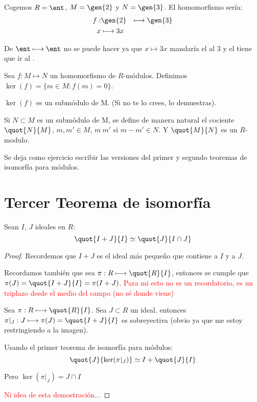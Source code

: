 \begin{example}
	Cogemos $R= \ent$, $M=\gen{2}$ y $N=\gen{3}$. El homomorfismo sería:
	\begin{align*}
		f:& \gen{2} & \longmapsto  \gen{3}\\
		x & \longmapsto 3x \\
	\end{align*}
	
	\obs De $\ent \longmapsto \ent$ no se puede hacer ya que $x \longmapsto 3x$ mandaría el \one al 3 y el \one tiene que ir al \one.
\end{example}

\begin{defn}
	Sea $f:M \longmapsto N$ un homomorfismo de $R$-módulos. Definimos $\ker(f)=\{ m\in M:f(m)=0 \}$.
\end{defn}

\obs $\ker(f)$ es un submódulo de M. (Si no te lo crees, lo demuestras).

\begin{defn}
Si $N \subset M$ es un submódulo de M, se define de manera natural el cociente $\quot{N}{M}$, $m,m' \in M$, $m~m'$ si $m-m' \in N$. Y $\quot{M}{N}$ es un $R$-modulo.
\end{defn}

Se deja como ejercicio escribir las versiones del primer y segundo teoremas de isomorfía para módulos.

\section{Tercer Teorema de isomorfía}
\begin{theorem}
	Sean $I$, $J$ ideales en $R$:
	$$ \quot{I+J}{I} \simeq \quot{J}{I \cap J} $$
\end{theorem}
\begin{proof}
	Recordemos que $I+J$ es el ideal más pequeño que contiene a $I$ y a $J$.
	
	Recordamos también que sea $\pi: R \longmapsto \quot{R}{I}$, entonces se cumple que $\pi(J)=\quot{I+J}{I}=\pi(I+J)$. \textcolor{red}{Para mi esto no es un recordatorio, es un triplazo desde el medio del campo (no sé donde viene)}
	
	Sea $\pi: R \longmapsto \quot{R}{I}$. Sea $J \subset R$ un ideal. entonces $\pi|_J:J \longmapsto \pi(J)=\quot{I+J}{I}$ es sobreyectiva (obvio ya que me estoy restringiendo a la imagen).
	
	Usando el primer teorema de isomorfía para módulos:
	$$ \quot{J}{\ker(\pi|_J)} \simeq I+\quot{J}{I} $$
	
	Pero $\ker(\pi|_J)=J \cap I$
	
	\textcolor{red}{Ni idea de esta demostración...}
\end{proof}

